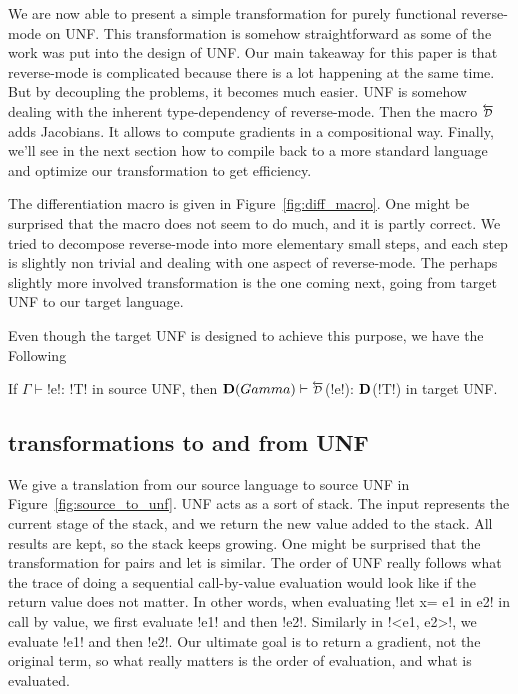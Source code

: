 We are now able to present a simple transformation for purely functional reverse-mode on UNF.
This transformation is somehow straightforward as some of the work was put into the design of UNF.
Our main takeaway for this paper is that reverse-mode is complicated because there is a lot happening at the same time. 
But by decoupling the problems, it becomes much easier. UNF is somehow dealing with the inherent type-dependency of reverse-mode.
Then the macro $\Dsynrevsymbol$ adds Jacobians. It allows to compute gradients in a compositional way.
Finally, we'll see in the next section how to compile back to a more standard language and optimize our transformation to get efficiency.

The differentiation macro is given in Figure~\ref{fig:diff_macro}.
One might be surprised that the macro does not seem to do much, and it is partly correct.
We tried to decompose reverse-mode into more elementary small steps, and each step is slightly non trivial and dealing with one aspect of reverse-mode.
The perhaps slightly more involved transformation is the one coming next,  going from target UNF to our target language.



Even though the target UNF is designed to achieve this purpose, we have the Following

\begin{proposition}
    If $\Gamma \vdash$!e!: !T! in source UNF, then
    $\Dtype(Gamma)\vdash \Dsynrevsymbol$(!e!):  $\mathbf{D}$(!T!) in target UNF.
\end{proposition}

\subsection{transformations to and from UNF} %
\label{sub:transformations to and from UNF}

We give a translation from our source language to source UNF in Figure~\ref{fig:source_to_unf}.
UNF acts as a sort of stack. 
The input represents the current stage of the stack, and we return the new value added to the stack.
All results are kept, so the stack keeps growing. One might be surprised that the transformation for pairs and let is similar.
The order of UNF really follows what the trace of doing a sequential call-by-value evaluation would look like if the return value does not matter.
In other words, when evaluating !let x= e1 in e2! in call by value, we first evaluate !e1! and then !e2!. 
Similarly in !<e1, e2>!, we evaluate !e1! and then !e2!. 
Our ultimate goal is to return a gradient, not the original term, so what really matters is the order of evaluation, and what is evaluated.


